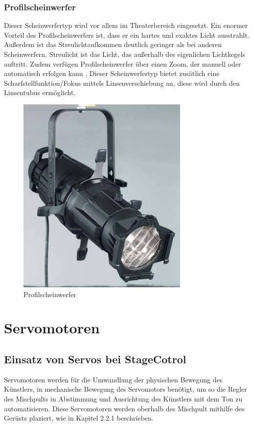 \newpage
\subsubsection{Profilscheinwerfer}
Dieser Scheinwerfertyp wird vor allem im Theaterbereich eingesetzt. Ein enormer Vorteil des Profilscheinwerfers ist, dass er ein hartes und exaktes Licht ausstrahlt. Außerdem ist das Streulichtaufkommen deutlich geringer als bei anderen Scheinwerfern. Streulicht ist das Licht, das außerhalb des eigenlichen Lichtkegels auftritt. Zudem verfügen Profilscheinwerfer über einen Zoom, der manuell oder automatisch erfolgen kann \parencite{Profilscheinwerfer}. Dieser Scheinwerfertyp bietet zusätlich eine Scharfstellfunktion/Fokus mittels Linsenverschiebung an, diese wird durch den Linsentubus ermöglicht.\\


\begin{figure}[H]
	\centering
	\includegraphics[width=0.4\linewidth]{images/Profilscheinwerfer.jpg}
	\caption[Profilscheinwerfer]{Profilscheinwerfer}
	\label{fig:Profilscheinwerfer}
\end{figure}

\section{Servomotoren}
\subsection{Einsatz von Servos bei StageCotrol}
Servomotoren werden für die Umwandlung der physischen Bewegung des Künstlers, in mechanische Bewegung des Servomotors benötigt, um so die Regler des Mischpults in Abstimmung und Ausrichtung des Künstlers mit dem Ton zu automatisieren. Diese Servomotoren werden oberhalb des Mischpult mithilfe des Gerüsts plaziert, wie in Kapitel 2.2.1 beschrieben.

\newpage
